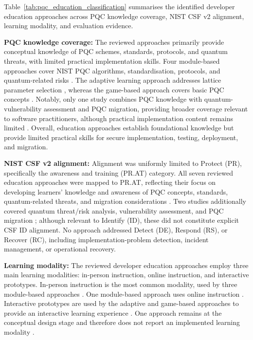 \documentclass[letterpaper,twocolumn,10pt]{article}
\begin{document}
Table~\ref{tab:pqc_education_classification} summarises the identified developer education approaches across PQC knowledge coverage, NIST CSF v2 alignment, learning modality, and evaluation evidence.

\textbf{PQC knowledge coverage: } The reviewed approaches primarily provide conceptual knowledge of PQC schemes, standards, protocols, and quantum threats, with limited practical implementation skills. Four module-based approaches cover NIST PQC algorithms, standardisation, protocols, and quantum-related risks \cite{Ana_borrelli_towards_2025, Ana_borrelli_designing_2024, Ana_edComScSociety, Ana_PQCIP, Ana_EducModule}. The adaptive learning approach addresses lattice parameter selection \cite{Ana_PQCLabEdu}, whereas the game-based approach covers basic PQC concepts \cite{Ana_abdelhamid_wip_2024}. Notably, only one study combines PQC knowledge with quantum-vulnerability assessment and PQC migration, providing broader coverage relevant to software practitioners, although practical implementation content remains limited \cite{Ana_PQCIP}. Overall, education approaches establish foundational knowledge but provide limited practical skills for secure implementation, testing, deployment, and migration. 

\textbf{NIST CSF v2 alignment: } Alignment was uniformly limited to Protect (PR), specifically the awareness and training (PR.AT) category. All seven reviewed education approaches were mapped to PR.AT, reflecting their focus on developing learners' knowledge and awareness of PQC concepts, standards, quantum-related threats, and migration considerations \cite{Ana_borrelli_towards_2025, Ana_borrelli_designing_2024, Ana_edComScSociety, Ana_PQCIP, Ana_EducModule, Ana_PQCLabEdu, Ana_abdelhamid_wip_2024}. Two studies additionally covered quantum threat/risk analysis, vulnerability assessment, and PQC migration \cite{Ana_edComScSociety, Ana_PQCIP}; although relevant to Identify (ID), these did not constitute explicit CSF ID alignment. No approach addressed Detect (DE), Respond (RS), or Recover (RC), including implementation-problem detection, incident management, or operational recovery.

\textbf{Learning modality: } The reviewed developer education approaches employ three main learning modalities: in-person instruction, online instruction, and interactive prototypes. In-person instruction is the most common modality, used by three module-based approaches \cite{Ana_borrelli_towards_2025, Ana_borrelli_designing_2024, Ana_edComScSociety}. One module-based approach uses online instruction \cite{Ana_PQCIP}. Interactive prototypes are used by the adaptive and game-based approaches to provide an interactive learning experience \cite{Ana_PQCLabEdu, Ana_abdelhamid_wip_2024}. One approach remains at the conceptual design stage and therefore does not report an implemented learning modality \cite{Ana_EducModule}. 
\end{document}
